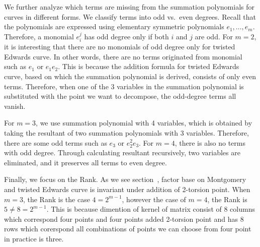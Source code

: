 

We further analyze which terms are missing from the summation
polynomials for curves in different forms.
%
We classify terms into odd vs.~even degrees.
%
Recall that the polynomials are expressed using elementary symmetric polynomials 
$e_1, \dots ,e_m$.
%
Therefore, a monomial $e_i^j$ has odd degree only if both $i$ and $j$
are odd.
%
For $m=2$, it is interesting that there are no monomials of odd degree
only for twisted Edwards curve.
%
In other words, there are no terms originated from monomial such as
$e_1$ or $e_1e_2$.
%
This is because the addition formula for twisted Edwards curve, based
on which the summation polynomial is derived, consists of only even
terms.
%
Therefore, when one of the 3 variables in the summation polynomial is
substituted with the point we want to decompose, the odd-degree terms
all vanish.

For $m=3$, we use summation polynomial with 4 variables, which is
obtained by taking the resultant of two summation polynomials 
with 3 variables.
%
Therefore, there are some odd terms such as $e_3$ or $e_2^2e_3$.
%
For $m=4$, there is also no terms with odd degree.
%
Through calculating resultant recursively, two variables are
eliminated, and it preserves all terms to even degree.

Finally, we focus on the Rank.
%
As we see section~\cite{sec:isomorphisms}, factor base on
Montgomery and twisted Edwards curve is invariant under addition
of 2-torsion point.
%
When $m=3$, the Rank is the case $4 = 2^{m-1}$,
however the case of $m=4$, the Rank is $5 \neq 8 = 2^{m-1}$.
%
This is because dimention of kernel of matrix consist of 8 
columns which correspond four points and four points added 
2-torsion point and has 8 rows which corerspond all combinations
of points we can choose from four point in practice is three.
%



